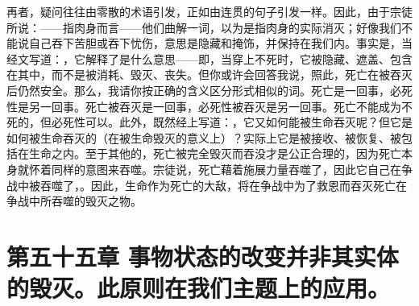再者，疑问往往由零散的术语引发，正如由连贯的句子引发一样。因此，由于宗徒所说：——指肉身而言——他们曲解一词，以为是指肉身的实际消灭；好像我们不能说自己吞下苦胆或吞下忧伤，意思是隐藏和掩饰，并保持在我们内。事实是，当经文写道：，它解释了是什么意思——即，当穿上不死时，它被隐藏、遮盖、包含在其中，而不是被消耗、毁灭、丧失。但你或许会回答我说，照此，死亡在被吞灭后仍然安全。那么，我请你按正确的含义区分形式相似的词。死亡是一回事，必死性是另一回事。死亡被吞灭是一回事，必死性被吞灭是另一回事。死亡不能成为不死的，但必死性可以。此外，既然经上写道：，它又如何能被生命吞灭呢？但它是如何被生命吞灭的（在被生命毁灭的意义上）？实际上它是被接收、被恢复、被包括在生命之内。至于其他的，死亡被完全毁灭而吞没才是公正合理的，因为死亡本身就怀着同样的意图来吞噬。宗徒说，死亡藉着施展力量吞噬了，因此它自己在争战中被吞噬了，。因此，生命作为死亡的大敌，将在争战中为了救恩而吞灭死亡在争战中所吞噬的毁灭之物。\par


\section{第五十五章 事物状态的改变并非其实体的毁灭。此原则在我们主题上的应用。}

